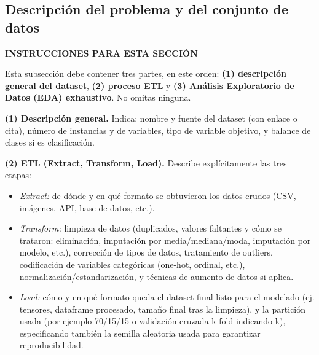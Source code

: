\documentclass[pdflatex,sn-mathphys-num]{sn-jnl}
\newenvironment{instruccion}{%
  \par\noindent\textbf{\color{blue!55!black}INSTRUCCIONES PARA ESTA SECCIÓN}%
  \par\vspace{2pt}\noindent\itshape\small
}{%
  \par\normalfont\vspace{6pt}
}
\begin{document}
\subsection{Descripción del problema y del conjunto de datos}\label{subsec:datos}

\begin{instruccion}
Esta subsección debe contener tres partes, en este orden: \textbf{(1) descripción general del dataset}, \textbf{(2) proceso ETL} y \textbf{(3) Análisis Exploratorio de Datos (EDA) exhaustivo}. No omitas ninguna.

\textbf{(1) Descripción general.} Indica: nombre y fuente del dataset (con enlace o cita), número de instancias y de variables, tipo de variable objetivo, y balance de clases si es clasificación.

\textbf{(2) ETL (Extract, Transform, Load).} Describe explícitamente las tres etapas:
\begin{itemize}
\item \textit{Extract:} de dónde y en qué formato se obtuvieron los datos crudos (CSV, imágenes, API, base de datos, etc.).
\item \textit{Transform:} limpieza de datos (duplicados, valores faltantes y cómo se trataron: eliminación, imputación por media/mediana/moda, imputación por modelo, etc.), corrección de tipos de datos, tratamiento de outliers, codificación de variables categóricas (one-hot, ordinal, etc.), normalización/estandarización, y técnicas de aumento de datos si aplica.
\item \textit{Load:} cómo y en qué formato queda el dataset final listo para el modelado (ej. tensores, dataframe procesado, tamaño final tras la limpieza), y la partición usada (por ejemplo 70/15/15 o validación cruzada k-fold indicando k), especificando también la semilla aleatoria usada para garantizar reproducibilidad.
\end{itemize}


\end{instruccion}
\end{document}
